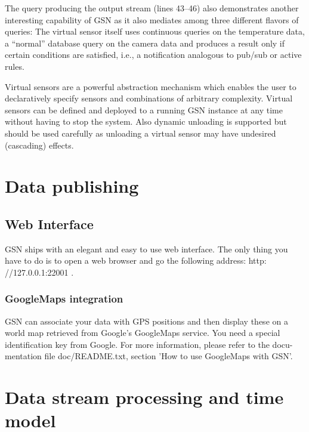 The query producing the output stream (lines 43--46) also demonstrates another
interesting capability of GSN as it also mediates among three different flavors
of queries: The virtual sensor itself uses continuous queries on the
temperature data, a ``normal'' database query on the camera data and
produces a result only if certain conditions are satisfied, i.e., a
notification analogous to pub/sub or active rules.

Virtual sensors are a powerful abstraction mechanism which enables the user to
declaratively specify sensors and combinations of arbitrary complexity. Virtual
sensors can be defined and deployed to a running GSN instance at any time
without having to stop the system. Also dynamic unloading is supported but
should be used carefully as unloading a virtual sensor may have undesired
(cascading) effects. 




\section{Data publishing}

\subsection{Web Interface}

GSN ships with an elegant and easy to use web interface. The only thing
you have to do is to open a web browser and go the following address: http:
//127.0.0.1:22001 .

\subsubsection{GoogleMaps integration}
GSN can associate your data with GPS positions and then display these on
a world map retrieved from Google's GoogleMaps service. You need a special
identification key from Google. For more information, please refer to the docu-
mentation file doc/README.txt, section 'How to use GoogleMaps with GSN'.

\section{Data stream processing and time model}
\label{sec:data-stre-proc}

